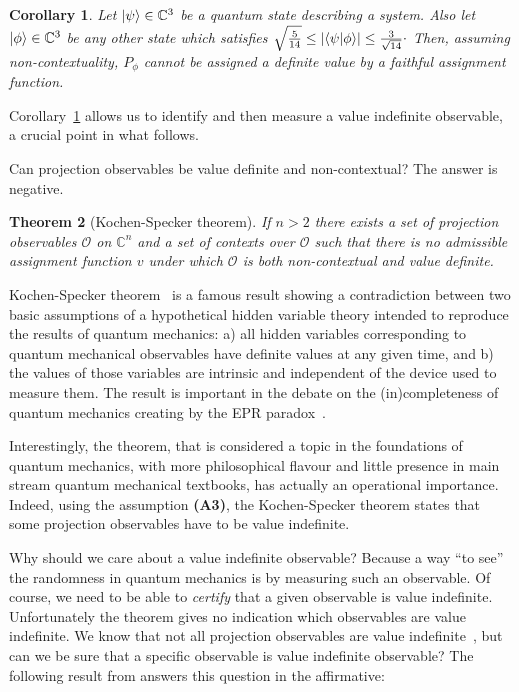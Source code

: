 \documentclass[%
 preprint,
 showpacs,
 showkeys,
 preprintnumbers,
  amsmath,amssymb,
  aps,
 pra,
  longbibliography,
  floatfix,
 ]{revtex4-1}
\theoremstyle{plain}
\newtheorem{theorem}{Theorem}[section]
\newtheorem{corollary}[theorem]{Corollary}
\newcommand{\iprod}[2]{\langle #1 | #2 \rangle}
\begin{document}
\begin{corollary}
        \label{cor:VIContext}
        Let $\ket{\psi} \in \mathbb{C}^3$ be a quantum state describing a system.
        Also let $\ket{\phi} \in \mathbb{C}^3$ be any other state which satisfies $\sqrt{\frac{5}{14}} \le |\iprod{\psi}{\phi}| \le \frac{3}{\sqrt{14}}\raisebox{.8mm}{.}$
        Then, assuming non-contextuality, $P_\phi$ cannot be assigned a definite value by a faithful assignment function.
\end{corollary}

Corollary~\ref{cor:VIContext} allows us to identify and then measure a value indefinite observable, a crucial point in what follows.
\fi

  Can projection observables  be value definite and non-contextual? The answer is negative.

 \begin{theorem}[Kochen-Specker theorem]
\label{thm:kstheorem}
 If $n>2$ there exists a set of projection observables $\mathcal{O}$ on $\mathbb{C}^n$ and a set of contexts over $\mathcal{O}$ such that there is no admissible assignment function $v$ under which $\mathcal{O}$ is both non-contextual and value definite.
\end{theorem}

Kochen-Specker theorem~\cite{KS} is a famous result showing  a contradiction between two basic assumptions of a hypothetical hidden variable theory intended to reproduce the results of quantum mechanics: a) all hidden variables corresponding to quantum mechanical observables have definite values at any given time, and b)  the values of those variables are intrinsic and independent of the device used to measure them.
The result is important  in the debate on the (in)completeness of quantum mechanics  creating by the  EPR paradox~\cite{epr}.

\medskip

Interestingly, the theorem, that
is considered a topic in the foundations of quantum mechanics, with more philosophical flavour and little presence in main stream quantum mechanical textbooks, has actually an operational importance. Indeed,
using the assumption {\bf (A3)}, the Kochen-Specker theorem states that some projection observables  have to be value indefinite.

\medskip

Why should we care about a value indefinite observable? Because a way ``to see'' the randomness in quantum mechanics is by measuring such an observable.
Of course, we need to be able to {\em certify} that a given observable is value indefinite. Unfortunately
  the  theorem gives no indication which  observables are value indefinite. We know that not all projection observables are value indefinite~\cite{ACCS}, but can we be sure that a specific observable is value indefinite observable? The following result from \cite{ACCS} answers this question in the affirmative:
\end{document}
